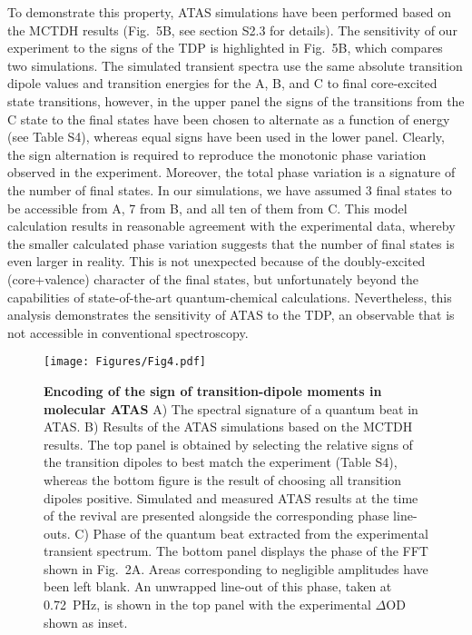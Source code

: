 \documentclass[12pt]{article}
\begin{document}
To demonstrate this property, ATAS simulations \cite{golubev2020ATAS} have been performed based on the MCTDH results (Fig.~5B, see section S2.3 for details). The sensitivity of our experiment to the signs of the TDP is highlighted in Fig.~5B, which compares two simulations. The simulated transient spectra use the same absolute transition dipole values and transition energies for the A, B, and C to final core-excited state transitions, however, in the upper panel the signs of the transitions from the C state to the final states have been chosen to alternate as a function of energy (see Table S4), whereas equal signs have been used in the lower panel. Clearly, the sign alternation is required to reproduce the monotonic phase variation observed in the experiment. Moreover, the total phase variation is a signature of the number of final states. In our simulations, we have assumed 3 final states to be accessible from A, 7 from B, and all ten of them from C. This model calculation results in reasonable agreement with the experimental data, whereby the smaller calculated phase variation suggests that the number of final states is even larger in reality. This is not unexpected because of the doubly-excited (core+valence) character of the final states, but unfortunately beyond the capabilities of state-of-the-art quantum-chemical calculations. Nevertheless, this analysis demonstrates the sensitivity of ATAS to the TDP, an observable that is not accessible in conventional spectroscopy.


\begin{figure}
    \centering
    \texttt{[image: Figures/Fig4.pdf]}
    \caption{
    \textbf{Encoding of the sign of transition-dipole moments in molecular ATAS}  A) The spectral signature of a quantum beat in ATAS. B) Results of the ATAS simulations based on the MCTDH results. The top panel is obtained by selecting the relative signs of the transition dipoles to best match the experiment (Table S4), whereas the bottom figure is the result of choosing all transition dipoles positive. Simulated and measured ATAS results at the time of the revival are presented alongside the corresponding phase line-outs. C) Phase of the quantum beat extracted from the experimental transient spectrum. The bottom panel displays the phase of the FFT shown in Fig.~2A. Areas corresponding to negligible amplitudes have been left blank. An unwrapped line-out of this phase, taken at 0.72~PHz, is shown in the top panel with the experimental $\Delta$OD shown as inset.
    }
\end{figure}
\end{document}
